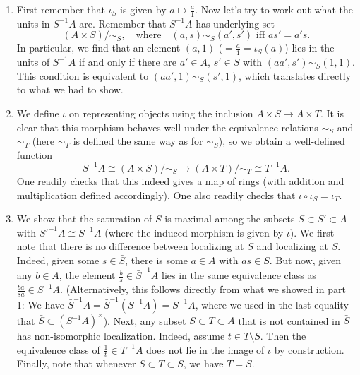 \documentclass[a4paper,11pt]{article}
\begin{document}
\begin{enumerate}
    \item First remember that $\iota_S$ is given by $a \mapsto \frac a1$. 
        Now let's try to work out what the units in $S^{-1}A$ are. Remember that
        $S^{-1}A$ has underlying set 
        \begin{equation*}
            (A \times S) / \sim_S, \quad \text{where} \quad
            (a,s) \sim_S (a', s') \text{ iff } as' = a's. 
        \end{equation*}
        In particular, we find that an element $(a,1)$ ($=\frac a1 = \iota_S(a)$)
        lies in the units of
        $S^{-1}A$ if and only if there are $a' \in A$, $s' \in S$ with 
        $(a a', s') \sim_S (1,1)$. This condition is equivalent to
        $(a a', 1) \sim_S (s', 1)$, which translates directly to what we had to
        show. 

    \item We define $\iota$ on representing objects using the inclusion
        $A \times S \to A \times T$. It is clear that this morphism behaves well
        under the equivalence relations $\sim_S$ and $\sim_T$ (here $\sim_T$ is
        defined the same way as for $\sim_S$), so we obtain a well-defined function
        \begin{equation*}
            S^{-1}A \cong (A \times S)/\sim_S \to (A\times T)/\sim_T \cong T^{-1}A.
        \end{equation*}
        One readily checks that this indeed gives a map of rings (with
        addition and multiplication defined accordingly). One also readily checks 
        that $\iota \circ \iota_S = \iota_T$. 

    \item We show that the saturation of $S$ is maximal among the subsets $S
        \subset S' \subset A$ with $S'^{-1} A \cong S^{-1} A$ (where the induced 
        morphism is given by $\iota$). 
        We first note that there is no difference between localizing at $S$ and
        localizing at $\bar S$. Indeed, given some $s \in \bar S$, there is 
        some $a \in A$ with $as \in S$. But now, given any $b \in A$, the element 
        $\frac bs \in \bar S^{-1} A$ lies in the same equivalence class
        as $\frac{ba}{sa} \in S^{-1} A$. (Alternatively, this follows directly from 
        what we showed in part 1: We have $\bar S^{-1} A = \bar S^{-1}(S^{-1} A) = S^{-1}A$,
        where we used in the last equality that $\bar S \subset
        (S^{-1}A)^\times$). Next, any subset $S \subset T \subset A$
        that is not contained in $\bar S$ has non-isomorphic localization.
        Indeed, assume $t \in T \setminus \bar S$. Then the
        equivalence class of $\frac 1t \in T^{-1}A$ does not lie in the image
        of $\iota$ by construction. Finally, note that whenever
        $S \subset T \subset \bar S$, we have $\bar T = \bar S$. 
        

\end{enumerate}
\end{document}
